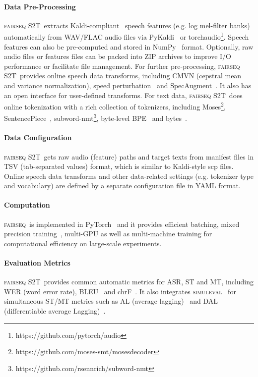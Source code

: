 \documentclass[11pt,a4paper]{article}
\newcommand{\fairseq}{\textsc{fairseq}}
\newcommand{\stot}{\textsc{fairseq S2T}}
\begin{document}
\paragraph{Data Pre-Processing}
\stot~extracts Kaldi-compliant~\citep{povey2011kaldi} speech features (e.g. log mel-filter banks) automatically from WAV/FLAC audio files via PyKaldi~\citep{pykaldi} or torchaudio\footnote{https://github.com/pytorch/audio}.
Speech features can also be pre-computed and stored in NumPy~\citep{harris2020array} format. Optionally, raw audio files or features files can be packed into ZIP archives to improve I/O performance or facilitate file management. For further pre-processing, \stot~provides online speech data transforms, including CMVN (cepstral mean and variance normalization), speed perturbation~\citep{ko2017study} and SpecAugment~\citep{park2019specaugment}. It also has an open interface for user-defined transforms. For text data, \stot~does online tokenization with a rich collection of tokenizers, including Moses\footnote{https://github.com/moses-smt/mosesdecoder}, SentencePiece~\citep{kudo-richardson-2018-sentencepiece}, subword-nmt\footnote{https://github.com/rsennrich/subword-nmt}, byte-level BPE~\citep{wang2020aaai} and bytes~\citep{li2019bytes}.

\paragraph{Data Configuration} \stot~gets raw audio (feature) paths and target texts from manifest files in TSV (tab-separated values) format, which is similar to Kaldi-style scp files. Online speech data transforms and other data-related settings (e.g. tokenizer type and vocabulary) are defined by a separate configuration file in YAML format.

\paragraph{Computation}
\fairseq~is implemented in PyTorch~\citep{paszke2019pytorch} and it provides efficient batching, mixed precision training~\citep{micikevicius2018mixed}, multi-GPU as well as multi-machine training for computational efficiency on large-scale experiments.

\paragraph{Evaluation Metrics} \stot~provides common automatic metrics for ASR, ST and MT, including WER (word error rate), BLEU~\citep{papineni2002bleu} and chrF~\citep{popovic2015chrf}. It also integrates \textsc{simuleval}~\citep{ma2020simuleval} for simultaneous ST/MT metrics such as AL (average lagging)~\citep{Ma2018STACLST} and DAL (differentiable average Lagging)~\citep{cherry2019thinking}.
\end{document}
